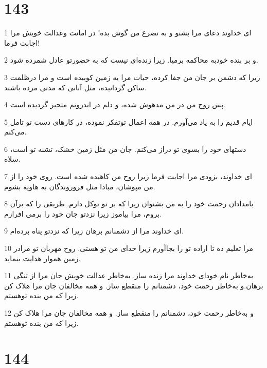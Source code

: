 \chapter{143}

\par 1 ای خداوند دعای مرا بشنو و به تضرع من گوش بده! در امانت وعدالت خویش مرا اجابت فرما!
\par 2 و بر بنده خودبه محاکمه برمیا. زیرا زنده‌ای نیست که به حضورتو عادل شمرده شود.
\par 3 زیرا که دشمن بر جان من جفا کرده، حیات مرا به زمین کوبیده است و مرا درظلمت ساکن گردانیده، مثل آنانی که مدتی مرده باشند.
\par 4 پس روح من در من مدهوش شده، و دلم در اندرونم متحیر گردیده است.
\par 5 ایام قدیم را به یاد می‌آورم. در همه اعمال توتفکر نموده، در کارهای دست تو تامل می‌کنم.
\par 6 دستهای خود را بسوی تو دراز می‌کنم. جان من مثل زمین خشک، تشنه تو است، سلاه.
\par 7 ‌ای خداوند، بزودی مرا اجابت فرما زیرا روح من کاهیده شده است. روی خود را از من مپوشان، مبادا مثل فروروندگان به هاویه بشوم.
\par 8 بامدادان رحمت خود را به من بشنوان زیرا که بر تو توکل دارم. طریقی را که برآن بروم، مرا بیاموز زیرا نزدتو جان خود را برمی افرازم.
\par 9 ‌ای خداوند مرا از دشمنانم برهان زیرا که نزدتو پناه برده‌ام. 
\par 10 مرا تعلیم ده تا اراده تو را بجاآورم زیرا خدای من تو هستی. روح مهربان تو مرادر زمین هموار هدایت بنماید.
\par 11 به‌خاطر نام خود‌ای خداوند مرا زنده ساز. به‌خاطر عدالت خویش جان مرا از تنگی برهان.و به‌خاطر رحمت خود، دشمنانم را منقطع ساز. و همه مخالفان جان مرا هلاک کن زیرا که من بنده توهستم.
\par 12 و به‌خاطر رحمت خود، دشمنانم را منقطع ساز. و همه مخالفان جان مرا هلاک کن زیرا که من بنده توهستم.
 
\chapter{144}

